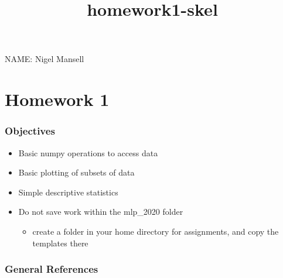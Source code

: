 \documentclass[11pt]{article}
\title{homework1-skel}
\providecommand{\tightlist}{%
      \setlength{\itemsep}{0pt}\setlength{\parskip}{0pt}}
\begin{document}
    
    
    \maketitle
    
    

    
    NAME: Nigel Mansell

\hypertarget{homework-1}{%
\section{Homework 1}\label{homework-1}}

\hypertarget{objectives}{%
\subsubsection{Objectives}\label{objectives}}

\begin{itemize}
\tightlist
\item
  Basic numpy operations to access data
\item
  Basic plotting of subsets of data
\item
  Simple descriptive statistics
\item
  Do not save work within the mlp\_2020 folder

  \begin{itemize}
  \tightlist
  \item
    create a folder in your home directory for assignments, and copy the
    templates there
  \end{itemize}
\end{itemize}

\hypertarget{general-references}{%
\subsubsection{General References}\label{general-references}}
\end{document}
